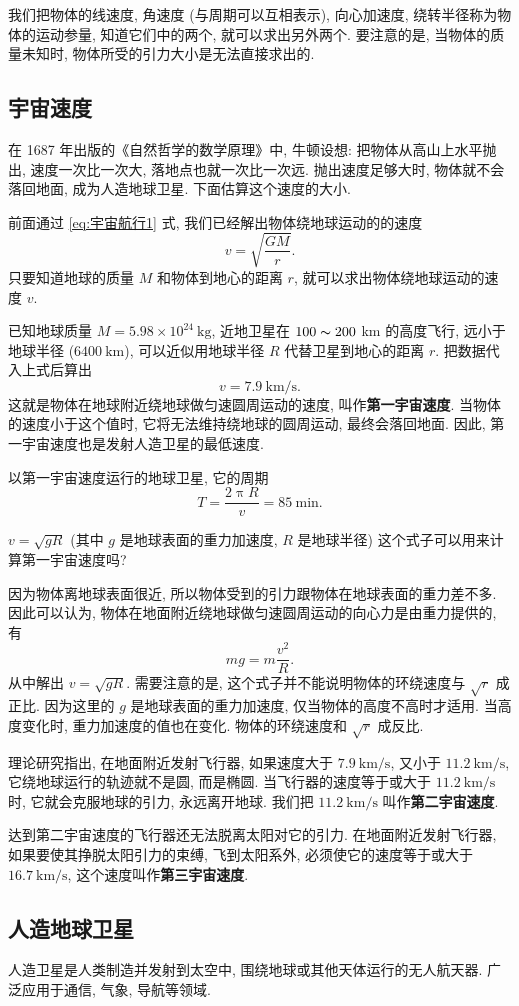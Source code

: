 \documentclass[UTF8,openany,fontset=fandol]{ctexbook}
\theoremstyle{chinesetextbook}
\newcommand{\unit}[1]{\ \mathrm{#1}}
\begin{document}
我们把物体的线速度, 角速度 (与周期可以互相表示), 向心加速度, 绕转半径称为物体的运动参量, 知道它们中的两个, 就可以求出另外两个. 要注意的是, 当物体的质量未知时, 物体所受的引力大小是无法直接求出的.
\subsection{宇宙速度}
{\kaishu 在 1687 年出版的《自然哲学的数学原理》中, 牛顿设想: 把物体从高山上水平抛出, 速度一次比一次大, 落地点也就一次比一次远. 抛出速度足够大时, 物体就不会落回地面, 成为人造地球卫星. 下面估算这个速度的大小.}

前面通过 \eqref{eq:宇宙航行1} 式, 我们已经解出物体绕地球运动的的速度
\[
v=\sqrt{\displaystyle\frac{GM}{r}}.
\]
只要知道地球的质量 $M$ 和物体到地心的距离 $r$, 就可以求出物体绕地球运动的速度 $v$.

已知地球质量 $M=5.98\times 10^{24}\unit{kg}$, 近地卫星在 $100\thicksim 200$ km 的高度飞行, 远小于地球半径 ($6400\unit{km}$), 可以近似用地球半径 $R$ 代替卫星到地心的距离 $r$. 把数据代入上式后算出
\[
v=7.9\unit{km/s}.
\]
这就是物体在地球附近绕地球做匀速圆周运动的速度, 叫作\textbf{第一宇宙速度}. 当物体的速度小于这个值时, 它将无法维持绕地球的圆周运动, 最终会落回地面. 因此, 第一宇宙速度也是发射人造卫星的最低速度.

以第一宇宙速度运行的地球卫星, 它的周期
\[
T=\frac{2\uppi R}{v}=85\unit{min}.
\]

{\kaishu $v=\sqrt{gR}$ (其中 $g$ 是地球表面的重力加速度, $R$ 是地球半径) 这个式子可以用来计算第一宇宙速度吗?}

因为物体离地球表面很近, 所以物体受到的引力跟物体在地球表面的重力差不多. 因此可以认为, 物体在地面附近绕地球做匀速圆周运动的向心力是由重力提供的, 有
\[
mg=m\frac{v^2}{R}.
\]
从中解出 $v=\sqrt{gR}.$ 需要注意的是, 这个式子并不能说明物体的环绕速度与 $\sqrt{r}$ 成正比. 因为这里的 $g$ 是地球表面的重力加速度, 仅当物体的高度不高时才适用. 当高度变化时, 重力加速度的值也在变化. 物体的环绕速度和 $\sqrt{r}$ 成反比.

理论研究指出, 在地面附近发射飞行器, 如果速度大于 $7.9\unit{km/s}$, 又小于 $11.2\unit{km/s}$, 它绕地球运行的轨迹就不是圆, 而是椭圆. 当飞行器的速度等于或大于 $11.2\unit{km/s}$ 时, 它就会克服地球的引力, 永远离开地球. 我们把 $11.2\unit{km/s}$ 叫作\textbf{第二宇宙速度}.

达到第二宇宙速度的飞行器还无法脱离太阳对它的引力. 在地面附近发射飞行器, 如果要使其挣脱太阳引力的束缚, 飞到太阳系外, 必须使它的速度等于或大于 $16.7\unit{km/s}$, 这个速度叫作\textbf{第三宇宙速度}.
\subsection{人造地球卫星}
人造卫星是人类制造并发射到太空中, 围绕地球或其他天体运行的无人航天器. 广泛应用于通信, 气象, 导航等领域.
\end{document}
